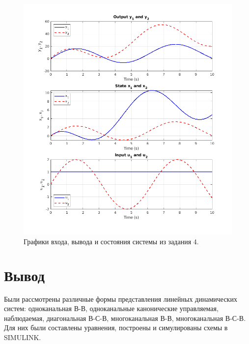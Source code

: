 \begin{figure}[htbp]
    \centering
    \includegraphics[width=1\linewidth]{figs/task_4_out.png}
    \caption{Графики входа, вывода и состояния системы из задания 4.}
    \label{fig:task4_out}
\end{figure}



\section{Вывод}

Были рассмотрены различные формы представления линейных динамических
систем: одноканальная В-В, одноканальные канонические управляемая, наблюдаемая,
диагональная В-С-В, многоканальная В-В, многоканальная В-С-В. Для них были составлены
уравнения, построены и симулированы схемы в SIMULINK.
